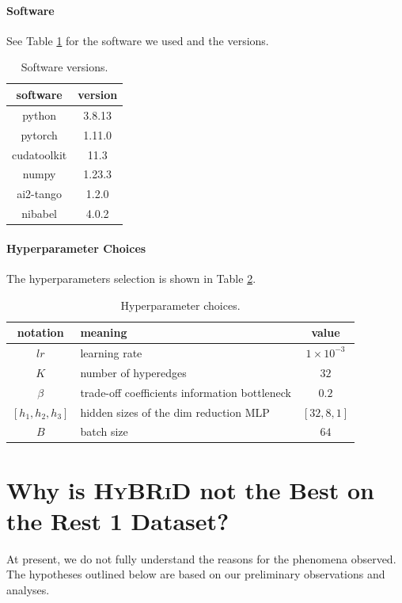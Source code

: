 \paragraph{Software}
See Table \ref{tab:software} for the software we used and the versions.
\begin{table}[H]
    \centering
    \caption{Software versions.}
    \label{tab:software}
    \begin{tabular}{cc}
    \toprule
    software & version\\
    \midrule
    python & 3.8.13\\
       pytorch  & 1.11.0 \\
       cudatoolkit & 11.3 \\
       numpy  & 1.23.3 \\
       ai2-tango & 1.2.0\\
       nibabel & 4.0.2\\
       \bottomrule
    \end{tabular}
\end{table}

\paragraph{Hyperparameter Choices}
The hyperparameters selection is shown in Table \ref{tab:hyper}.

\begin{table}
    \centering
    \caption{Hyperparameter choices.}
    \label{tab:hyper}
    \begin{tabularx}{\columnwidth{}}{cXc}
    \toprule
         notation&  meaning& value\\
         \midrule
         $lr$&  learning rate& $1\times 10^{-3}$\\
         $K$&  number of hyperedges& $32$\\
         $\beta$& trade-off coefficients information bottleneck& $0.2$\\
         $[h_1, h_2, h_3]$&  hidden sizes of the dim reduction MLP& $[32,8,1]$\\
         $B$&  batch size& $64$\\
         \bottomrule
    \end{tabularx}
\end{table}

\section{Why is \textsc{HyBRiD} not the Best on the Rest 1 Dataset?}
\label{app:why_fail}
At present, we do not fully understand the reasons for the phenomena observed. The hypotheses outlined below are based on our preliminary observations and analyses.

